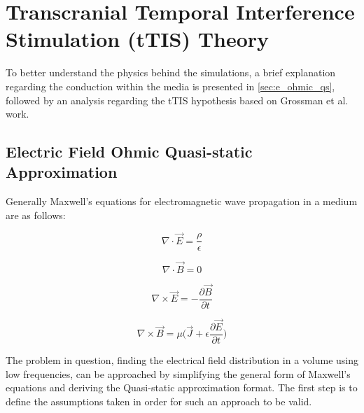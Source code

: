 \pagebreak
\chapter{Transcranial Temporal Interference Stimulation (tTIS) Theory}

To better understand the physics behind the simulations, a brief explanation regarding the conduction within the media is presented in \autoref{sec:e_ohmic_qs}, followed by an analysis regarding the \gls{tTIS} hypothesis based on Grossman et al.\cite{Grossman2017} work.

\section{Electric Field Ohmic Quasi-static Approximation}
\label{sec:e_ohmic_qs}

Generally Maxwell's equations for electromagnetic wave propagation in a medium are as follows:
\begin{center}
\begin{minipage}{.35\linewidth}
    \begin{equation}
        \nabla\cdot\vec{E}=\dfrac{\rho}{\epsilon}
    \end{equation}
\end{minipage}
\begin{minipage}{.35\linewidth}
    \begin{equation}
        \nabla\cdot\vec{B} = 0
    \end{equation}
\end{minipage}\break
\begin{minipage}{.35\linewidth}
    \begin{equation}
        \label{eq:maxwell_curl_e}
        \nabla\times\vec{E}=-\dfrac{\partial\vec{B}}{\partial t}
    \end{equation}
\end{minipage}
\begin{minipage}{.35\linewidth}
    \begin{equation}
        \nabla\times\vec{B} = \mu\Bigg(\vec{J} + \epsilon\dfrac{\partial\vec{E}}{\partial t}\Bigg)
    \end{equation}
\end{minipage}
\end{center}

\noindent The problem in question, finding the electrical field distribution in a volume using low frequencies, can be approached by simplifying the general form of Maxwell's equations and deriving the Quasi-static approximation format. The first step is to define the assumptions taken in order for such an approach to be valid.

